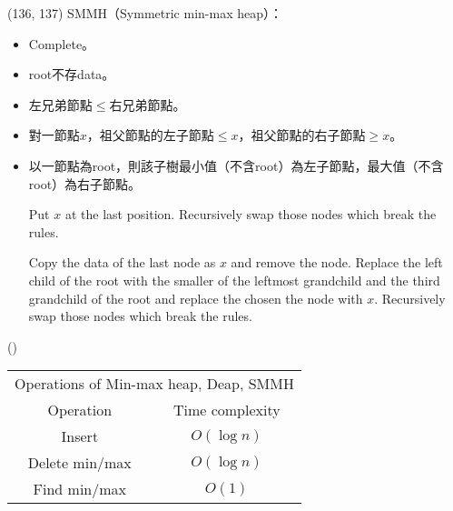 \item \begin{theorem}{(136, 137)} SMMH（Symmetric min-max heap）： \label{smmh}\begin{itemize}
        \item Complete。
        \item root不存data。
        \item 左兄弟節點$\le$右兄弟節點。
        \item 對一節點$x$，祖父節點的左子節點$\le x$，祖父節點的右子節點$\ge x$。
        \item 以一節點為root，則該子樹最小值（不含root）為左子節點，最大值（不含root）為右子節點。
        \begin{algorithm}[H]
            \begin{algorithmic}[1]
                    \State Put $x$ at the last position.
                    \State Recursively swap those nodes which break the rules.
                \EndFunction
            \end{algorithmic}
        \end{algorithm}
        \begin{algorithm}[H]
            \begin{algorithmic}[1]
                    \State Copy the data of the last node as $x$ and remove the node.
                    \State Replace the left child of the root with the smaller of the leftmost grandchild and the third grandchild of the root and replace the chosen the node with $x$.
                    \State Recursively swap those nodes which break the rules.
                \EndFunction
            \end{algorithmic}
        \end{algorithm}
    \end{itemize}
\end{theorem}

\item \begin{theorem}{()} \quad\quad \begin{table}[H]
        \centering
        \begin{tabular}{|c|c|}
            \hline
            \multicolumn{2}{|c|}{Operations of Min-max heap, Deap, SMMH} \\
            \Xhline{3\arrayrulewidth}
            Operation & Time complexity \\
            \Xhline{2\arrayrulewidth}
            Insert & $O(\log n)$ \\
            \hline
            Delete min/max & $O(\log n)$ \\
            \hline
            Find min/max & $O(1)$ \\
            \hline
        \end{tabular}
    \end{table} 
\end{theorem}

